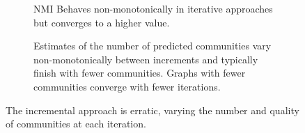 \begin{figure}[htbp]
    \centering
    \begin{subfigure}[b]{0.45\textwidth}  %
        \centering
        \caption{\acs{NMI} Behaves non-monotonically in iterative approaches but converges to a higher value.}
        \label{fig:gt-community-nmi}
    \end{subfigure}
    \hfill
    \begin{subfigure}[b]{0.45\textwidth}  %
        \centering
        \caption{Estimates of the number of predicted communities vary non-monotonically between increments and typically finish with fewer communities. Graphs with fewer communities converge with fewer iterations.}
        \label{fig:gt-community-sizes}
    \end{subfigure}
    \caption{The incremental approach is erratic, varying the number and quality of communities at each iteration.}
    \label{fig:cd-results-effectiveness-community-lines}
\end{figure}
